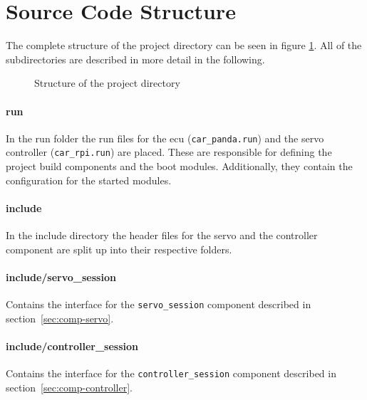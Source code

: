 \newpage

\section{Source Code Structure}
\label{sec:scs}
The complete structure of the project directory can be seen in figure \ref{fig:structure}. All of the subdirectories are described in more detail in the following. \\

\begin{figure}[h]
    \caption{Structure of the project directory}
    \label{fig:structure}
\end{figure}


\paragraph{run}
In the run folder the run files for the ecu (\texttt{car\_panda.run}) and the servo controller (\texttt{car\_rpi.run}) are placed.
These are responsible for defining the project build components and the boot modules. Additionally, they contain the configuration for the started modules.

\paragraph{include}
In the include directory the header files for the servo and the controller component are split up into their respective folders.

\paragraph{include/servo\_session}
Contains the interface for the \texttt{servo\_session} component described in section~\ref{sec:comp-servo}.

\paragraph{include/controller\_session}
Contains the interface for the \texttt{controller\_session} component described in section~\ref{sec:comp-controller}.

